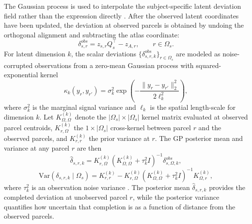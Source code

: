 \documentclass[11pt]{article}
\numberwithin{equation}{section}
\begin{document}
The Gaussian process is used to interpolate the subject-specific latent deviation
field rather than the expression directly \cite{rasmussen2006gpml}.  After the observed
latent coordinates have been updated, the deviation at observed parcels is obtained by
undoing the orthogonal alignment and subtracting the atlas coordinate:
\begin{equation}
  \label{eq:prob-observed-deviation}
  \delta_{s,r}^{obs} = z_{s,r}Q_s^\top - z_{A,r},
  \qquad r\in\Omega_s.
\end{equation}
For latent dimension $k$, the scalar deviations
$\{\delta_{s,r,k}^{obs}\}_{r\in\Omega_s}$ are modeled as noise-corrupted observations
from a zero-mean Gaussian process with squared-exponential kernel
\begin{equation}
  \label{eq:prob-kernel}
  \kappa_k(y_r,y_{r'})
  =
  \sigma_k^2
  \exp\!\left(
  -\frac{\|y_r-y_{r'}\|_2^2}{2\ell_k^2}
  \right),
\end{equation}
where $\sigma_k^2$ is the marginal signal variance and $\ell_k$ is the spatial
length-scale for dimension $k$.  Let $K_{\Omega,\Omega}^{(k)}$ denote the
$|\Omega_s|\times|\Omega_s|$ kernel matrix evaluated at observed parcel centroids,
$K_{r,\Omega}^{(k)}$ the $1\times|\Omega_s|$ cross-kernel between parcel $r$ and
the observed parcels, and $K_{r,r}^{(k)}$ the prior variance at $r$.  The GP
posterior mean and variance at any parcel $r$ are then
\begin{equation}
  \label{eq:prob-gp-mean}
  \hat{\delta}_{s,r,k}
  =
  K_{r,\Omega}^{(k)}
  \left(
  K_{\Omega,\Omega}^{(k)} + \tau_k^2 I
  \right)^{-1}
  \delta_{s,\Omega,k}^{obs},
\end{equation}
\begin{equation}
  \label{eq:prob-gp-var}
  \mathrm{Var}\!\left(
  \delta_{s,r,k}\mid \Omega_s
  \right)
  =
  K_{r,r}^{(k)}
  -
  K_{r,\Omega}^{(k)}
  \left(
  K_{\Omega,\Omega}^{(k)} + \tau_k^2 I
  \right)^{-1}
  K_{\Omega,r}^{(k)},
\end{equation}
where $\tau_k^2$ is an observation noise variance \cite{rasmussen2006gpml}.  The
posterior mean $\hat\delta_{s,r,k}$ provides the completed deviation at unobserved
parcel $r$, while the posterior variance quantifies how uncertain that completion is
as a function of distance from the observed parcels.
\end{document}
